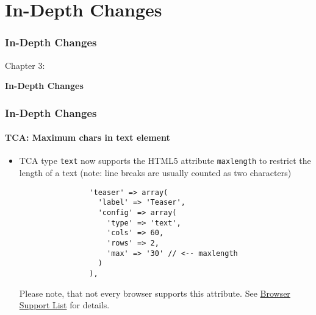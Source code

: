 %

\section{In-Depth Changes}
\begin{frame}[fragile]
	\frametitle{In-Depth Changes}

	\begin{center}\huge{Chapter 3:}\end{center}
	\begin{center}\huge{\color{typo3darkgrey}\textbf{In-Depth Changes}}\end{center}

\end{frame}


\begin{frame}[fragile]
	\frametitle{In-Depth Changes}
	\framesubtitle{TCA: Maximum chars in text element}

	\begin{itemize}
		\item TCA type \texttt{text} now supports the HTML5 attribute \texttt{maxlength}
			to restrict the length of a text (note: line breaks are usually counted as two
			characters)

			\begin{lstlisting}
				'teaser' => array(
				  'label' => 'Teaser',
				  'config' => array(
				    'type' => 'text',
				    'cols' => 60,
				    'rows' => 2,
				    'max' => '30' // <-- maxlength
				  )
				),
			\end{lstlisting}

			Please note, that not every browser supports this attribute.\newline
			See \href{http://www.w3schools.com/tags/att_textarea_maxlength.asp}{Browser Support List} for details.

	\end{itemize}

\end{frame}

